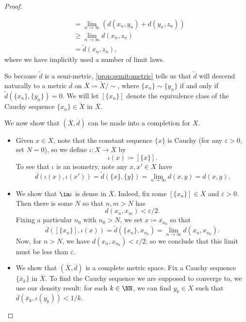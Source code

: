 \documentclass[../notes.tex]{subfiles}
\begin{document}
\begin{proof}
\begin{itemize}
\begin{align*}
			&= \lim_{n\to\infty}(d(x_n,y_n)+d(y_n,z_n)) \\
			&\ge \lim_{n\to\infty}d(x_n,z_n) \\
			&= \widetilde d(x_n,z_n),
		\end{align*}
		where we have implicitly used a number of limit laws.
	\end{itemize}
	So because $\widetilde d$ is a semi-metric, \autoref{prop:semitometric} tells us that $\widetilde d$ will descend naturally to a metric $\overline d$ on $\overline X\coloneqq\widetilde X/{\sim}$, where $\{x_n\}\sim\{y_n\}$ if and only if $\widetilde d(\{x_n\},\{y_n\})=0$. We will let $[\{x_n\}]$ denote the equivalence class of the Cauchy sequence $\{x_n\}\in\widetilde X$ in $\overline X$.

	We now show that $(\overline X,\overline d)$ can be made into a completion for $X$.
	\begin{itemize}
		\item Given $x\in X$, note that the constant sequence $\{x\}$ is Cauchy (for any $\varepsilon>0$, set $N=0$), so we define $\iota\colon X\to\overline X$ by
		\[\iota(x)\coloneqq[\{x\}].\]
		To see that $\iota$ is an isometry, note any $x,x'\in X$ have
		\[\overline d(\iota(x),\iota(x'))=\widetilde d(\{x\},\{y\})=\lim_{n\to\infty}d(x,y)=d(x,y).\]
		\item We show that $\im\iota$ is dense in $\overline X$. Indeed, fix some $[\{x_n\}]\in\overline X$ and $\varepsilon>0$. Then there is some $N$ so that $n,m>N$ has
		\[d(x_n,x_m)<\varepsilon/2.\]
		Fixing a particular $n_0$ with $n_0>N$, we set $x\coloneqq x_{n_0}$ so that
		\[\overline d([\{x_n\}],\iota(x))=\widetilde d(\{x_n\},x_{n_0})=\lim_{n\to\infty}d(x_n,x_{n_0}).\]
		Now, for $n>N$, we have $d(x_n,x_{n_0})<\varepsilon/2$, so we conclude that this limit must be less than $\varepsilon$.
		\item We show that $(\overline X,\overline d)$ is a complete metric space. Fix a Cauchy sequence $\{\overline x_k\}$ in $\overline X$. To find the Cauchy sequence we are supposed to converge to, we use our density result: for each $k\in\NN$, we can find $y_k\in X$ such that $\overline d(\overline x_k,\iota(y_k))<1/k$.


\end{itemize}
\end{proof}
\end{document}
